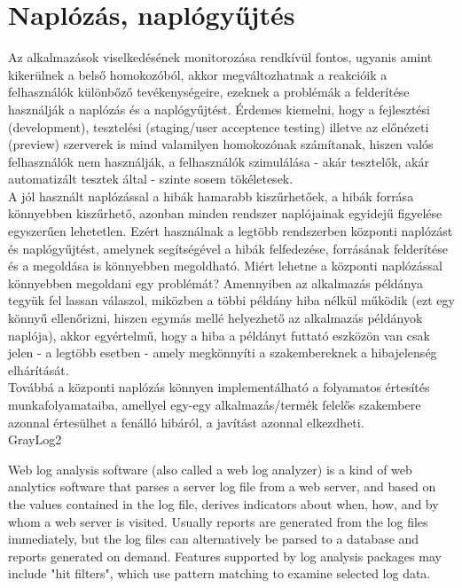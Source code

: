 \section{Naplózás, naplógyűjtés}

Az alkalmazások viselkedésének monitorozása rendkívül fontos, ugyanis amint kikerülnek a belső homokozóból, akkor megváltozhatnak a reakcióik a felhasználók különbőző tevékenységeire, ezeknek a problémák a felderítése használják a naplózás és a naplógyűjtést. Érdemes kiemelni, hogy a fejlesztési (development), tesztelési (staging/user acceptence testing) illetve az előnézeti (preview) szerverek is mind valamilyen homokozónak számítanak, hiszen valós felhasználók nem használják, a felhasználók szimulálása - akár tesztelők, akár automatizált tesztek által - szinte sosem tökéletesek.
\\
A jól használt naplózással a hibák hamarabb kiszűrhetőek, a hibák forrása könnyebben kiszűrhető, azonban minden rendszer naplójainak egyidejű figyelése egyszerűen lehetetlen. Ezért használnak a legtöbb rendszerben központi naplózást és naplógyűjtést, amelynek segítségével a hibák felfedezése, forrásának felderítése és a megoldása is könnyebben megoldható. Miért lehetne a központi naplózással könnyebben megoldani egy problémát? Amennyiben az alkalmazás példánya tegyük fel lassan válaszol, miközben a többi példány hiba nélkül működik (ezt egy könnyű ellenőrizni, hiszen egymás mellé helyezhető az alkalmazás példányok naplója), akkor egyértelmű, hogy a hiba a példányt futtató eszközön van csak jelen - a legtöbb esetben - amely megkönnyíti a szakembereknek a hibajelenség elhárítását.
\\
Továbbá a központi naplózás könnyen implementálható a folyamatos értesítés munkafolyamataiba, amellyel egy-egy alkalmazás/termék felelős szakembere azonnal értesülhet a fenálló hibáról, a javítást azonnal elkezdheti.
\\ 
GrayLog2

Web log analysis software (also called a web log analyzer) is a kind of web analytics software that parses a server log file from a web server, and based on the values contained in the log file, derives indicators about when, how, and by whom a web server is visited. Usually reports are generated from the log files immediately, but the log files can alternatively be parsed to a database and reports generated on demand.
Features supported by log analysis packages may include "hit filters", which use pattern matching to examine selected log data.


